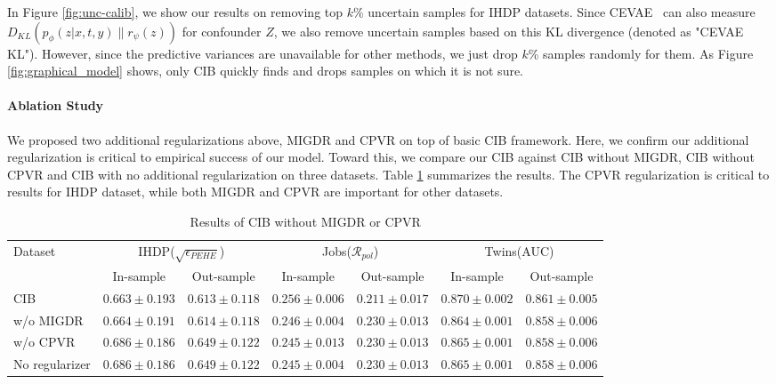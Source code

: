 \documentclass{article}
\begin{document}
    In Figure \ref{fig:unc-calib}, we show our results on removing top $k$\% uncertain samples for IHDP datasets. Since CEVAE~\cite{Louizos17} can also measure $D_{KL}( p_{\phi}(z|x,t,y) \| r_{\psi}(z) )$ for confounder $Z$, we also remove uncertain samples based on this KL divergence (denoted as "CEVAE KL"). However, since the predictive variances are unavailable for other methods, we just drop $k$\% samples randomly for them. As Figure \ref{fig:graphical_model} shows, only CIB quickly finds and drops samples on which it is not sure.
    
    
    


    \vspace{.2cm}
    \paragraph{Ablation Study} 
    We proposed two additional regularizations above, MIGDR and CPVR on top of basic CIB framework. Here, we confirm our additional regularization is critical to empirical success of our model. Toward this, we compare our CIB against CIB without MIGDR, CIB without CPVR and CIB with no additional regularization on three datasets. Table \ref{ablation-study} summarizes the results. The CPVR regularization is critical to results for IHDP dataset, while both MIGDR and CPVR are important for other datasets.







\setlength{\textfloatsep}{0.5cm}
\begin{table}[t]
  \centering
  \caption{Results of CIB without MIGDR or CPVR}
  \label{ablation-study}
  {\scriptsize\begin{tabular}{lcccccc}
    \toprule
    \multirow{2}{*}{Dataset} & \multicolumn{2}{c}{IHDP($\sqrt{\epsilon_{PEHE}}$)} & \multicolumn{2}{c}{Jobs($\mathcal{R}_{pol}$)} & \multicolumn{2}{c}{Twins(AUC)} \\
    & In-sample & Out-sample & In-sample & Out-sample & In-sample & Out-sample \\
    \midrule
    CIB & ${0.663 \pm 0.193}$ & ${0.613 \pm 0.118}$ & ${0.256 \pm 0.006}$ & ${0.211 \pm 0.017}$ & ${0.870 \pm 0.002}$ & ${0.861 \pm 0.005}$ \\
    \midrule
    w/o MIGDR & $0.664 \pm 0.191$ & $0.614 \pm 0.118$ & $0.246 \pm 0.004$ & $0.230 \pm 0.013$ & $0.864 \pm 0.001$ & $0.858 \pm 0.006$ \\
    w/o CPVR & $0.686 \pm 0.186$ & $0.649 \pm 0.122$ & $0.245 \pm 0.013$ & $0.230 \pm 0.013$ & $0.865 \pm 0.001$ & $0.858 \pm 0.006$ \\
    No regularizer & $0.686 \pm 0.186$ & $0.649 \pm 0.122$ & $0.245 \pm 0.004$ & $0.230 \pm 0.013$ & $0.865 \pm 0.001$ & $0.858 \pm 0.006$ \\
    \bottomrule
  \end{tabular}}
\end{table}
\end{document}
